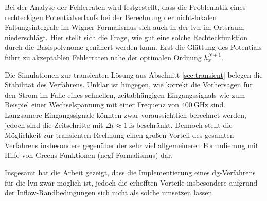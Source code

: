 Bei der Analyse der Fehlerraten wird festgestellt, dass die Problematik eines rechteckigen Potentialverlaufs bei der Berechnung der nicht-lokalen Faltungsintegrale im Wigner-Formalismus sich auch in der \ac{lvn} im Ortsraum niederschlägt. Hier stellt sich die Frage, wie gut eine solche Rechteckfunktion durch die Basispolynome genähert werden kann. Erst die Glättung des Potentials führt zu akzeptablen Fehlerraten nahe der optimalen Ordnung $h_x^{N+1}$.

Die Simulationen zur transienten Lösung aus Abschnitt \ref{sec:transient} belegen die Stabilität des Verfahrens. Unklar ist hingegen, wie korrekt die Vorhersagen für den Strom im Falle eines schnellen, zeitabhängigen Eingangssignals wie zum Beispiel einer Wechselspannung mit einer Frequenz von $\SI{400}{\giga\hertz}$ sind. Langsamere Eingangssignale könnten zwar voraussichtlich berechnet werden, jedoch sind die Zeitschritte mit $\Delta t\approx\SI{1}{\femto\second}$ beschränkt. Dennoch stellt die Möglichkeit zur transienten Rechnung einen großen Vorteil des gesamten Verfahrens insbesondere gegenüber der sehr viel allgemeineren Formulierung mit Hilfe von Greens-Funktionen (\ac{negf}-Formalismus) dar.

Insgesamt hat die Arbeit gezeigt, dass die Implementierung eines \ac{dg}-Verfahrens für die \ac{lvn} zwar möglich ist, jedoch die erhofften Vorteile insbesondere aufgrund der Inflow-Randbedingungen sich nicht als solche umsetzen lassen.
